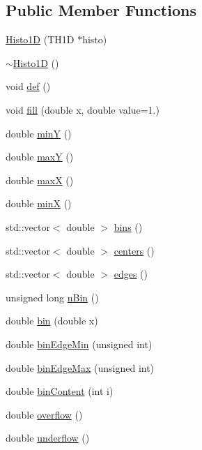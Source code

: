 \subsection*{Public Member Functions}
\begin{DoxyCompactItemize}
\item 
\hyperlink{classHisto1D_aecd55af9b972863d5cee5a387746fb96}{Histo1D} (T\+H1D $\ast$histo)
\item 
\hyperlink{classHisto1D_af62825fd9266c1903d403e489501daa9}{$\sim$\+Histo1D} ()
\item 
void \hyperlink{classHisto1D_a22b820e2c706d8e8614c31962f1ac6d0}{def} ()
\item 
void \hyperlink{classHisto1D_a907707c720f8f0d3f582632d186ee7dd}{fill} (double x, double value=1.)
\item 
double \hyperlink{classHisto1D_a122c7071e060672dd2c08ad92212b3a2}{minY} ()
\item 
double \hyperlink{classHisto1D_a60a1095ac5fbab109d20c54c2ee569a3}{maxY} ()
\item 
double \hyperlink{classHisto1D_a54c7464513d1382c7c66fa880bfe568e}{maxX} ()
\item 
double \hyperlink{classHisto1D_abe9bf76799889414686794502e777b67}{minX} ()
\item 
std\+::vector$<$ double $>$ \hyperlink{classHisto1D_aaa8cd492ee25a3ad1b1694349fb1024c}{bins} ()
\item 
std\+::vector$<$ double $>$ \hyperlink{classHisto1D_a07fd41679a3255cdd44d4dcf8865adb7}{centers} ()
\item 
std\+::vector$<$ double $>$ \hyperlink{classHisto1D_a8c74413d35bce2e244defd470b6b4ebf}{edges} ()
\item 
unsigned long \hyperlink{classHisto1D_a7f3cf7364ae6e1eb9ba08b5ffe897d8f}{n\+Bin} ()
\item 
double \hyperlink{classHisto1D_a2a8a7d93c2f10b73b490a6f550e00db4}{bin} (double x)
\item 
double \hyperlink{classHisto1D_aa15ab79f858358e3cafc0617eb668c2e}{bin\+Edge\+Min} (unsigned int)
\item 
double \hyperlink{classHisto1D_a7923d51b02056dbaef353b70c11499d0}{bin\+Edge\+Max} (unsigned int)
\item 
double \hyperlink{classHisto1D_aece5cb8dddafabe0029067dc3e4be878}{bin\+Content} (int i)
\item 
double \hyperlink{classHisto1D_a5d13018047a4ffb15e662f44a0a3f520}{overflow} ()
\item 
double \hyperlink{classHisto1D_a3bac7a207b9ed5f828001119b2f14869}{underflow} ()

\end{DoxyCompactItemize}
